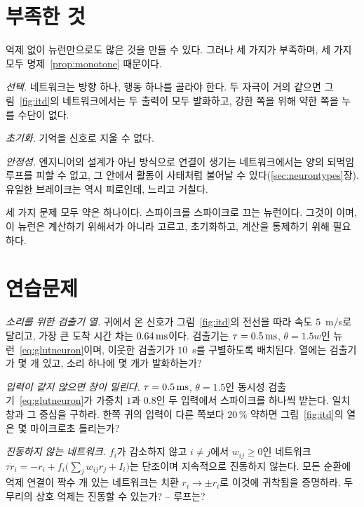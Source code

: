 \section{부족한 것}

억제 없이  뉴런만으로도 많은 것을 만들 수 있다. 그러나 세 가지가 부족하며, 세 가지 모두 명제~\ref{prop:monotone} 때문이다.

\emph{선택.} 네트워크는 방향 하나, 행동 하나를 골라야 한다. 두 자극이 거의 같으면 그림~\ref{fig:itd}의 네트워크에서는 두 출력이 모두 발화하고, 강한 쪽을 위해 약한 쪽을 누를 수단이 없다.

\emph{초기화.} 기억을 신호로 지울 수 없다.

\emph{안정성.} 엔지니어의 설계가 아닌 방식으로 연결이 생기는 네트워크에서는 양의 되먹임 루프를 피할 수 없고, 그 안에서 활동이 사태처럼 불어날 수 있다(\ref{sec:neurontypes}장). 유일한 브레이크는 역시 피로인데, 느리고 거칠다.

세 가지 문제 모두 약은 하나이다. 스파이크를 스파이크로 끄는 뉴런이다. 그것이 이며, 이 뉴런은 계산하기 위해서가 아니라 고르고, 초기화하고, 계산을 통제하기 위해 필요하다.

\section{연습문제}

\begin{exercise}[\lvlA]
\label{ex:02:1}
\emph{소리를 위한 검출기 열.} 귀에서 온 신호가 그림~\ref{fig:itd}의 전선을 따라 속도 $5$~m/s로 달리고, 가장 큰 도착 시간 차는 $0.64\,\text{ms}$이다. 검출기는 $\tau=0.5\,\text{ms}$, $\theta=1.5w$인 뉴런~\eqref{eq:glutneuron}이며, 이웃한 검출기가 $10$~\textmu s를 구별하도록 배치된다. 열에는 검출기가 몇 개 있고, 소리 하나에 몇 개가 발화하는가?
\end{exercise}

\begin{exercise}[\lvlB]
\label{ex:02:2}
\emph{입력이 같지 않으면 창이 밀린다.} $\tau=0.5\,\text{ms}$, $\theta=1.5$인 동시성 검출기~\eqref{eq:glutneuron}가 가중치 $1$과 $0.8$인 두 입력에서 스파이크를 하나씩 받는다. 일치 창과 그 중심을 구하라. 한쪽 귀의 입력이 다른 쪽보다 $20\,\%$ 약하면 그림~\ref{fig:itd}의 열은 몇 마이크로초 틀리는가?
\end{exercise}

\begin{exercise}[\lvlB]
\label{ex:02:3}
\emph{진동하지 않는 네트워크.} $f_i$가 감소하지 않고 $i\ne j$에서 $w_{ij}\ge0$인 네트워크 $\tau\dot r_i=-r_i+f_i\bigl(\textstyle\sum_jw_{ij}r_j+I_i\bigr)$는 단조이며 지속적으로 진동하지 않는다. 모든 순환에 억제 연결이 짝수 개 있는 네트워크는 치환 $r_i\to\pm r_i$로 이것에 귀착됨을 증명하라. 두 무리의 상호 억제는 진동할 수 있는가? -- 루프는?
\end{exercise}

